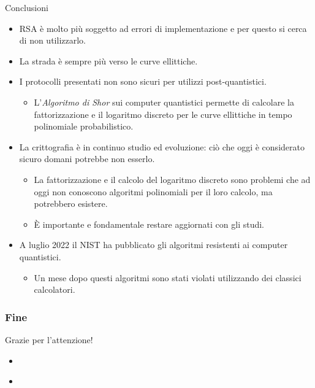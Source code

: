 \documentclass[11pt,svgnames,smaller,aspectratio=169,italian]{beamer}
\begin{document}
\begin{frame}{Conclusioni}
	\begin{itemize}
		\item RSA è molto più soggetto ad errori di implementazione e per questo si cerca di non utilizzarlo.
		\item La strada è sempre più verso le curve ellittiche.
		\item I protocolli presentati non sono sicuri per utilizzi post-quantistici.
			\begin{itemize}
				\item L'\emph{Algoritmo di Shor} sui computer quantistici permette di calcolare la fattorizzazione e il logaritmo discreto per le curve ellittiche in tempo polinomiale probabilistico.
			\end{itemize}
		\item La crittografia è in continuo studio ed evoluzione: ciò che oggi è considerato sicuro domani potrebbe non esserlo.
			\begin{itemize}
				\item La fattorizzazione e il calcolo del logaritmo discreto sono problemi che ad oggi non conoscono algoritmi polinomiali per il loro calcolo, ma potrebbero esistere.
				\item È importante e fondamentale restare aggiornati con gli studi.
			\end{itemize}
		\item A luglio 2022 il NIST ha pubblicato gli algoritmi resistenti ai computer quantistici.
			\begin{itemize}
				\item Un mese dopo questi algoritmi sono stati violati utilizzando dei classici calcolatori.
			\end{itemize}
	\end{itemize}
\end{frame}

\begin{frame}
		\frametitle{Fine}
		\centering
		\Large
		Grazie per l'attenzione!
 	\end{frame}

\begin{frame}{}
	\begin{itemize}
		\item 
	\end{itemize}
\end{frame}

\begin{frame}{}
	\begin{itemize}
		\item 
	\end{itemize}
\end{frame}
\end{document}
